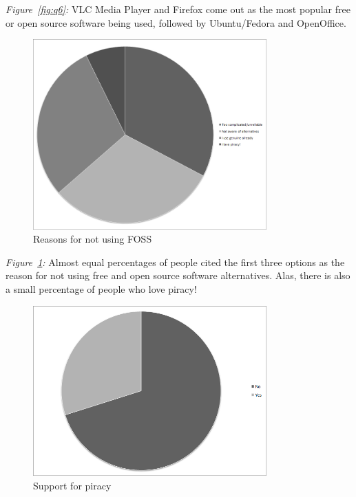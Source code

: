 \emph{Figure~\ref{fig:q6}:} VLC Media Player and Firefox come out as the most popular free or open source software being used, followed by Ubuntu/Fedora and OpenOffice.
\newpage
\begin{figure}[h!]
\centering
\includegraphics[width=0.8\textwidth]{./q7.png}
\caption{Reasons for not using FOSS}
\label{fig:q7}
\end{figure}

\emph{Figure~\ref{fig:q7}:} Almost equal percentages of people cited the first three options as the reason for not using free and open source software alternatives. Alas, there is also a small percentage of people who love piracy!
\newpage
\begin{figure}[h!]
\centering
\includegraphics[width=0.8\textwidth]{./q8.png}
\caption{Support for piracy}
\label{fig:q8}
\end{figure}

